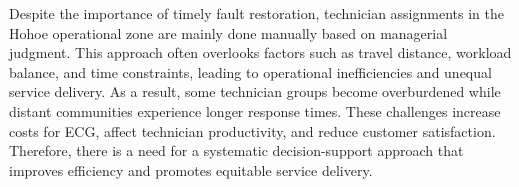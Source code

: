 \documentclass[11pt]{article}
\begin{document}
\vspace{0.25cm}
Despite the importance of timely fault restoration, technician assignments in the Hohoe operational zone are mainly done manually based on managerial judgment. This approach often overlooks factors such as travel distance, workload balance, and time constraints, leading to operational inefficiencies and unequal service delivery. As a result, some technician groups become overburdened while distant communities experience longer response times. These challenges increase costs for ECG, affect technician productivity, and reduce customer satisfaction. Therefore, there is a need for a systematic decision-support approach that improves efficiency and promotes equitable service delivery.
\end{document}
